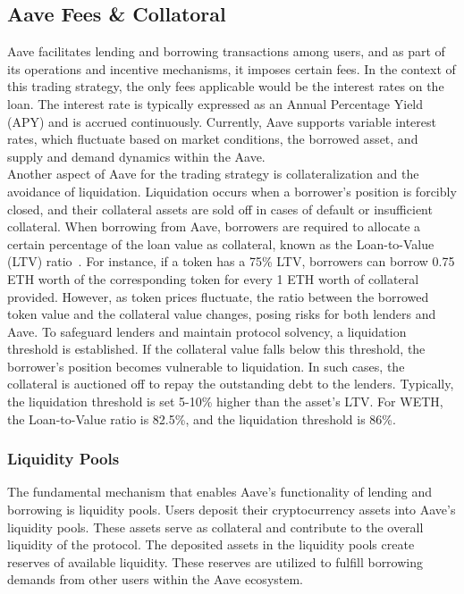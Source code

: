 \subsection{Aave Fees \& Collatoral}
Aave facilitates lending and borrowing transactions among users, and as part of its operations and incentive mechanisms, it imposes certain fees. In the context of this trading strategy, the only fees applicable would be the interest rates on the loan. The interest rate is typically expressed as an Annual Percentage Yield (APY) and is accrued continuously. Currently, Aave supports variable interest rates, which fluctuate based on market conditions, the borrowed asset, and supply and demand dynamics within the Aave.
\\[3mm]
Another aspect of Aave for the trading strategy is collateralization and the avoidance of liquidation. Liquidation occurs when a borrower's position is forcibly closed, and their collateral assets are sold off in cases of default or insufficient collateral. When borrowing from Aave, borrowers are required to allocate a certain percentage of the loan value as collateral, known as the Loan-to-Value (LTV) ratio~\cite{aave_risk}. For instance, if a token has a 75\% LTV, borrowers can borrow 0.75 ETH worth of the corresponding token for every 1 ETH worth of collateral provided. However, as token prices fluctuate, the ratio between the borrowed token value and the collateral value changes, posing risks for both lenders and Aave. To safeguard lenders and maintain protocol solvency, a liquidation threshold is established. If the collateral value falls below this threshold, the borrower's position becomes vulnerable to liquidation. In such cases, the collateral is auctioned off to repay the outstanding debt to the lenders. Typically, the liquidation threshold is set 5-10\% higher than the asset's LTV. For WETH, the Loan-to-Value ratio is 82.5\%, and the liquidation threshold is 86\%.


\subsubsection{Liquidity Pools}

The fundamental mechanism that enables Aave's functionality of lending and borrowing is liquidity pools. Users deposit their cryptocurrency assets into Aave's liquidity pools. These assets serve as collateral and contribute to the overall liquidity of the protocol. The deposited assets in the liquidity pools create reserves of available liquidity. These reserves are utilized to fulfill borrowing demands from other users within the Aave ecosystem.

